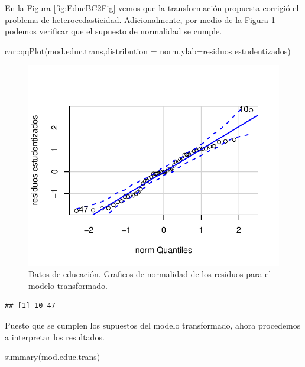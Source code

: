 \documentclass[
]{article}
\newenvironment{Shaded}{\begin{snugshade}}{\end{snugshade}}
\newcommand{\AttributeTok}[1]{\textcolor[rgb]{0.77,0.63,0.00}{#1}}
\newcommand{\FunctionTok}[1]{\textcolor[rgb]{0.00,0.00,0.00}{#1}}
\newcommand{\NormalTok}[1]{#1}
\newcommand{\SpecialCharTok}[1]{\textcolor[rgb]{0.00,0.00,0.00}{#1}}
\newcommand{\StringTok}[1]{\textcolor[rgb]{0.31,0.60,0.02}{#1}}
\begin{document}
En la Figura \ref{fig:EducBC2Fig} vemos que la transformación propuesta corrigió el problema de heterocedasticidad. Adicionalmente, por medio de la Figura \ref{fig:EducBC3Fig} podemos verificar que el supuesto de normalidad se cumple.

\begin{Shaded}
\begin{Highlighting}[]
\NormalTok{car}\SpecialCharTok{::}\FunctionTok{qqPlot}\NormalTok{(mod.educ.trans,}\AttributeTok{distribution =} \StringTok{\textquotesingle{}norm\textquotesingle{}}\NormalTok{,}\AttributeTok{ylab=}\StringTok{\textquotesingle{}residuos estudentizados\textquotesingle{}}\NormalTok{)}
\end{Highlighting}
\end{Shaded}

\begin{figure}

{\centering \includegraphics{MLGI_files/figure-latex/EducBC3Fig-1} 

}

\caption{Datos de educación. Graficos de normalidad de los residuos para el modelo transformado.}\label{fig:EducBC3Fig}
\end{figure}

\begin{verbatim}
## [1] 10 47
\end{verbatim}

Puesto que se cumplen los supuestos del modelo transformado, ahora procedemos a interpretar los resultados.

\begin{Shaded}
\begin{Highlighting}[]
\FunctionTok{summary}\NormalTok{(mod.educ.trans)}
\end{Highlighting}
\end{Shaded}
\end{document}
